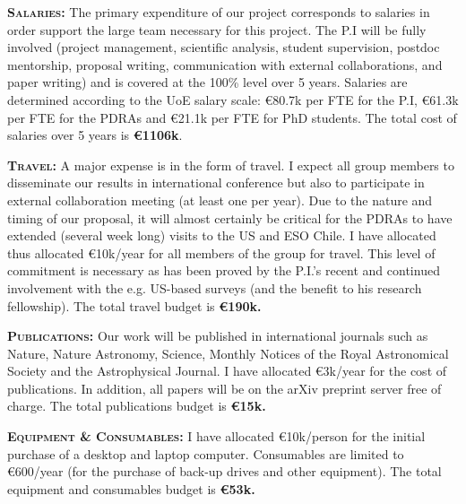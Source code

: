 \smallskip \smallskip
\noindent \textbf{\textsc{Salaries:}} The primary expenditure of our
project corresponds to salaries in order support the large team
necessary for this project.  The P.I will be fully involved (project
management, scientific analysis, student supervision, postdoc
mentorship, proposal writing, communication with external
collaborations, and paper writing) and is covered at the 100\% level
over 5 years.  Salaries are determined according to the UoE salary
scale: \euro80.7k per FTE for the P.I, \euro61.3k per FTE for the
PDRAs and \euro21.1k per FTE for PhD students.  The total cost of
salaries over 5 years is {\bf \euro 1106k}.

\smallskip \smallskip
\noindent \textbf{\textsc{Travel:}} A major expense is in the form of
travel. I expect all group members to disseminate our results in
international conference but also to participate in external
collaboration meeting (at least one per year). Due to the nature and
timing of our proposal, it will almost certainly be critical for the
PDRAs to have extended (several week long) visits to the US and ESO
Chile. I have allocated thus allocated \euro10k/year for all members
of the group for travel. This level of commitment is necessary as has
been proved by the P.I.'s recent and continued involvement with the
e.g.  US-based surveys (and the benefit to his research
fellowship). The total travel budget is {\bf \euro190k.}

\smallskip
\smallskip
\noindent
\textbf{\textsc{Publications:}}
Our work will be published in international journals such as Nature,
Nature Astronomy, Science, Monthly Notices of the Royal Astronomical
Society and the Astrophysical Journal. I have allocated \euro3k/year for
the cost of publications. In addition, all papers will be on the arXiv
preprint server free of charge. The total publications budget is {\bf \euro15k.}

\smallskip
\smallskip
\noindent
\textbf{\textsc{Equipment \& Consumables:}}
I have allocated \euro10k/person for the initial purchase of a desktop
and laptop computer. Consumables are limited to \euro600/year (for the
purchase of back-up drives and other equipment). The total equipment
and consumables budget is {\bf \euro53k.}

\iffalse
\smallskip
\smallskip
\noindent
\textbf{\textsc{Visitors and Workshop:}}
I have also included a budget for inviting specialists to give
seminars and to discuss our results. The budget for inviting visitors
is \euro4k per year (corresponding to 2 to 4 visitors depending on if they
travel locally or internationally). In 2021 when all the team members
are present, I also plan to host a small invitation-only workshop (20
people total) on the topic of the quasar light-curve and spectal analysis. 
This will enable us bring together specialists from the field to advertise our
results but also to provide feedback on our work. For the workshop, I
have included a budget a \euro5k for the workshop organization (rent for
conference room, coffee breaks) and \euro10k to invite five invited
speakers and to help support travel costs for invited speakers
(\euro2k/person). The total budget for the workshop and visitors is {\bf \euro35k}.
\fi

